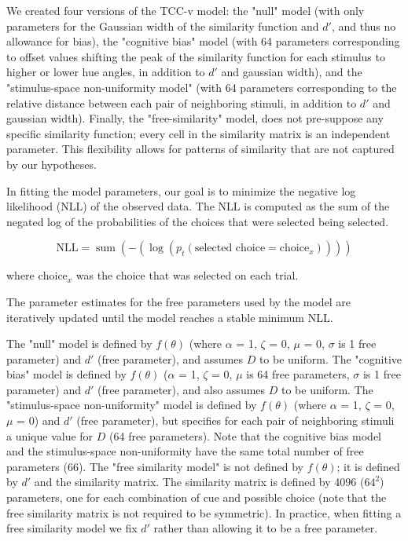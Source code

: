 \documentclass[9pt,biorxiv,lineno,onehalfspacing]{lapreprint}
\begin{document}
\begin{refsection}
We created four versions of the TCC-v model: the "null" model (with only parameters for the Gaussian width of the similarity function and $d'$, and thus no allowance for bias), the "cognitive bias" model (with 64 parameters corresponding to offset values shifting the peak of the similarity function for each stimulus to higher or lower hue angles, in addition to $d'$ and gaussian width), and the "stimulus-space non-uniformity model" (with 64 parameters corresponding to the relative distance between each pair of neighboring stimuli, in addition to $d'$ and gaussian width). 
Finally, the "free-similarity" model, does not pre-suppose any specific similarity function; every cell in the similarity matrix is an independent parameter. 
This flexibility allows for patterns of similarity that are not captured by our hypotheses. 

In fitting the model parameters, our goal is to minimize the negative log likelihood (NLL) of the observed data. 
The NLL is computed as the sum of the negated log of the probabilities of the choices that were selected being selected. 

\begin{equation}
    \text{NLL} = \operatorname{sum}\left(-\left(\log \left(p_t\left(\text {selected choice} = \text{choice}_x\right)\right)\right)\right)
\end{equation}

where $\text{choice}_x$ was the choice that was selected on each trial.

The parameter estimates for the free parameters used by the model are iteratively updated until the model reaches a stable minimum NLL. 

The "null" model is defined by $f(\theta)$ (where $\alpha$ = 1, $\zeta$ = 0, $\mu$ = 0, $\sigma$ is 1 free parameter) and $d'$ (free parameter), and assumes $D$ to be uniform. 
The "cognitive bias" model is defined by $f(\theta)$ ($\alpha$ = 1, $\zeta$ = 0, $\mu$ is 64 free parameters, $\sigma$ is 1 free parameter) and $d'$ (free parameter), and also assumes $D$ to be uniform. 
The "stimulus-space non-uniformity" model is defined by $f(\theta)$ (where $\alpha$ = 1, $\zeta$ = 0, $\mu$ = 0) and $d'$ (free parameter), but specifies for each pair of neighboring stimuli a unique value for $D$ (64 free parameters). 
Note that the cognitive bias model and the stimulus-space non-uniformity have the same total number of free parameters (66). 
The "free similarity model" is not defined by $f(\theta)$; it is defined by $d'$ and the similarity matrix. 
The similarity matrix is defined by 4096 ($64^2$) parameters, one for each combination of cue and possible choice (note that the free similarity matrix is not required to be symmetric).
In practice, when fitting a free similarity model we fix $d'$ rather than allowing it to be a free parameter.


\end{refsection}
\end{document}
